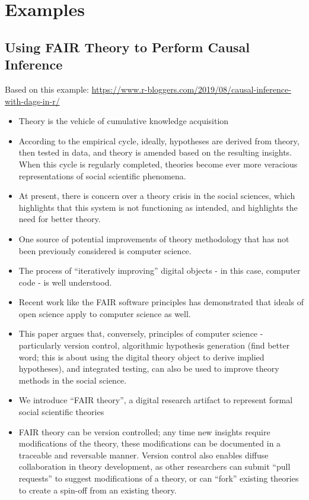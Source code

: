 \documentclass[
  man]{apa6}
\providecommand{\tightlist}{%
  \setlength{\itemsep}{0pt}\setlength{\parskip}{0pt}}
\begin{document}
\section{Examples}\label{examples}

\subsection{Using FAIR Theory to Perform Causal Inference}\label{using-fair-theory-to-perform-causal-inference}

Based on this example: \url{https://www.r-bloggers.com/2019/08/causal-inference-with-dags-in-r/}

\begin{itemize}
\tightlist
\item
  Theory is the vehicle of cumulative knowledge acquisition
\item
  According to the empirical cycle, ideally, hypotheses are derived from theory, then tested in data, and theory is amended based on the resulting insights. When this cycle is regularly completed, theories become ever more veracious representations of social scientific phenomena.
\item
  At present, there is concern over a theory crisis in the social sciences, which highlights that this system is not functioning as intended, and highlights the need for better theory.
\item
  One source of potential improvements of theory methodology that has not been previously considered is computer science.
\item
  The process of ``iteratively improving'' digital objects - in this case, computer code - is well understood.
\item
  Recent work like the FAIR software principles has demonstrated that ideals of open science apply to computer science as well.
\item
  This paper argues that, conversely, principles of computer science - particularly version control, algorithmic hypothesis generation (find better word; this is about using the digital theory object to derive implied hypotheses), and integrated testing, can also be used to improve theory methods in the social science.
\item
  We introduce ``FAIR theory'', a digital research artifact to represent formal social scientific theories
\item
  FAIR theory can be version controlled; any time new insights require modifications of the theory, these modifications can be documented in a traceable and reversable manner. Version control also enables diffuse collaboration in theory development, as other researchers can submit ``pull requests'' to suggest modifications of a theory, or can ``fork'' existing theories to create a spin-off from an existing theory.

\end{itemize}
\end{document}
